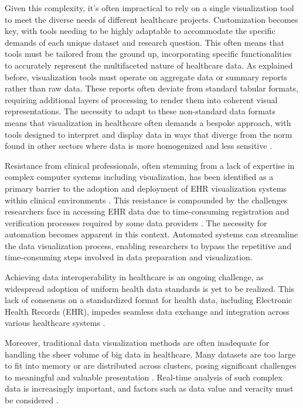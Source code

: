 Given this complexity, it's often impractical to rely on a single visualization tool to meet the diverse needs of different healthcare projects. Customization becomes key, with tools needing to be highly adaptable to accommodate the specific demands of each unique dataset and research question. This often means that tools must be tailored from the ground up, incorporating specific functionalities to accurately represent the multifaceted nature of healthcare data.
As explained before, visualization tools must operate on aggregate data or summary reports rather than raw data. These reports often deviate from standard tabular formats, requiring additional layers of processing to render them into coherent visual representations. The necessity to adapt to these non-standard data formats means that visualization in healthcare often demands a bespoke approach, with tools designed to interpret and display data in ways that diverge from the norm found in other sectors where data is more homogenized and less sensitive \cite{soa12}\cite{soa13}.

Resistance from clinical professionals, often stemming from a lack of expertise in complex computer systems including visualization, has been identified as a primary barrier to the adoption and deployment of EHR visualization systems within clinical environments \cite{soa14}. This resistance is compounded by the challenges researchers face in accessing EHR data due to time-consuming registration and verification processes required by some data providers \cite{soa15}. The necessity for automation becomes apparent in this context. Automated systems can streamline the data visualization process, enabling researchers to bypass the repetitive and time-consuming steps involved in data preparation and visualization.

Achieving data interoperability in healthcare is an ongoing challenge, as widespread adoption of uniform health data standards is yet to be realized. This lack of consensus on a standardized format for health data, including Electronic Health Records (EHR), impedes seamless data exchange and integration across various healthcare systems \cite{soc21}.

Moreover, traditional data visualization methods are often inadequate for handling the sheer volume of big data in healthcare. Many datasets are too large to fit into memory or are distributed across clusters, posing significant challenges to meaningful and valuable presentation \cite{soa13}. Real-time analysis of such complex data is increasingly important, and factors such as data value and veracity must be considered \cite{soa13}.


